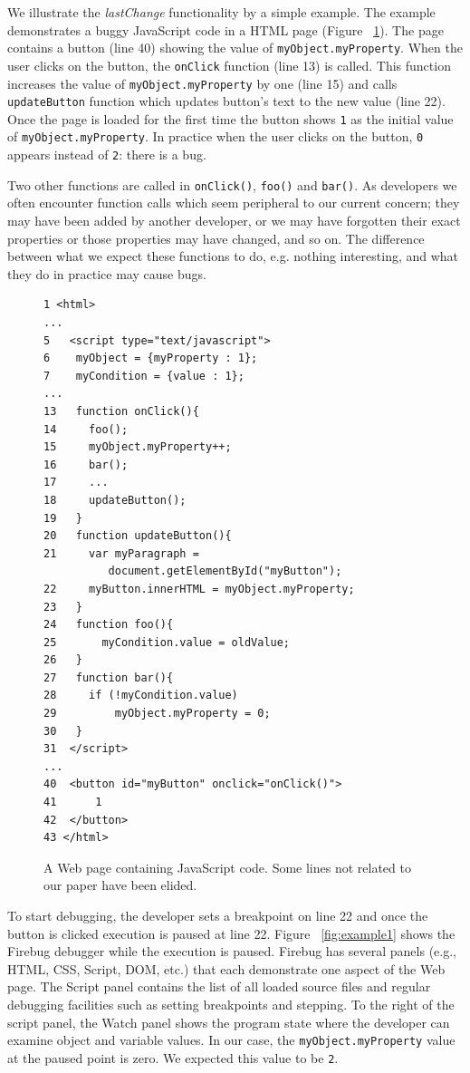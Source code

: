 \documentclass[preprint]{sigplanconf}
\begin{document}
We illustrate the \textit{lastChange} functionality by a simple
example. The example demonstrates a buggy JavaScript code in a HTML
page (Figure ~\ref{fig:js-code}). The page contains a button (line 40)
showing the value of \texttt{myObject.myProperty}.  When the user
clicks on the button, the \texttt{onClick} function (line 13) is
called. This function increases the value of
\texttt{myObject.myProperty} by one (line 15) and calls
\texttt{updateButton} function which updates button's text to the new
value (line 22).  Once the page is loaded for the first time the
button shows \texttt{1} as the initial value of
\texttt{myObject.myProperty}.  In practice when the user clicks on the
button, \texttt{0} appears instead of \texttt{2}: there is a bug.

Two other functions are called in \texttt{onClick()}, \texttt{foo()}
and \texttt{bar()}. As developers we often encounter function calls
which seem peripheral to our current concern; they may have been added
by another developer, or we may have forgotten their exact properties
or those properties may have changed, and so on. The difference
between what we expect these functions to do, e.g. nothing
interesting, and what they do in practice may cause bugs.


\begin{figure}[htp]
\begin{verbatim}
1 <html>
...
5   <script type="text/javascript">
6    myObject = {myProperty : 1};
7    myCondition = {value : 1};
...
13   function onClick(){
14     foo();
15     myObject.myProperty++;
16     bar();
17     ...
18     updateButton();
19   }
20   function updateButton(){
21     var myParagraph =
          document.getElementById("myButton");
22     myButton.innerHTML = myObject.myProperty;
23   }   
24   function foo(){
25  	 myCondition.value = oldValue;
26   }  
27   function bar(){ 
28     if (!myCondition.value)
29         myObject.myProperty = 0;
30   }
31  </script> 
...
40  <button id="myButton" onclick="onClick()">
41  	1 
42  </button>
43 </html>
\end{verbatim}
\caption{A Web page containing JavaScript code. Some lines not related to our paper have been elided.}
\label{fig:js-code}
\end{figure}

To start debugging, the developer sets a breakpoint
on line 22 and once the button is clicked execution is paused at line
22. Figure ~\ref{fig:example1} shows the Firebug debugger while the
execution is paused. Firebug has several panels (e.g., HTML, CSS,
Script, DOM, etc.) that each demonstrate one aspect of the Web page.
The Script panel contains the list of all loaded source
files and regular debugging facilities such as setting breakpoints and
stepping. To the right of the script panel, the Watch panel shows the program state
where the developer can examine object and variable values. In our case, the
\texttt{myObject.myProperty} value at the paused point is zero. We expected this value to be \texttt{2}.
\end{document}
